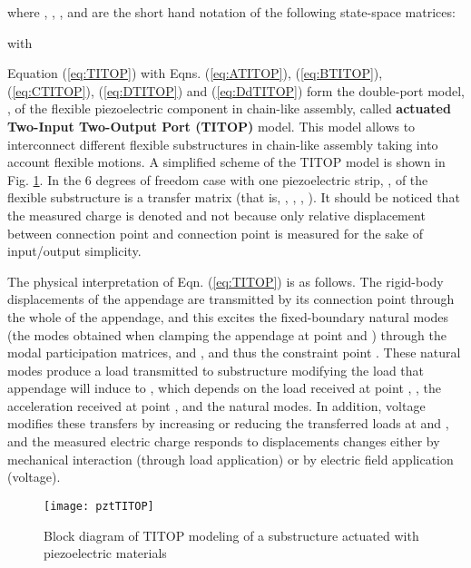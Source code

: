 \documentclass{ifacconf}
\begin{document}
where , , ,  and  are the short hand notation of the following state-space matrices:















with 



Equation (\ref{eq:TITOP}) with Eqns. (\ref{eq:ATITOP}), (\ref{eq:BTITOP}), (\ref{eq:CTITOP}), (\ref{eq:DTITOP}) and (\ref{eq:DdTITOP}) form the double-port model, , of the flexible piezoelectric component  in chain-like assembly, called \textbf{actuated Two-Input Two-Output Port (TITOP)} model. This model allows to interconnect different flexible substructures in chain-like assembly taking into account flexible motions. A simplified scheme of the TITOP model is shown in Fig. \ref{fig:pztTITOP}. In the 6 degrees of freedom case with one piezoelectric strip, , of the flexible substructure  is a  transfer matrix (that is, , , , ). It should be noticed that the measured charge is denoted  and not  because only relative displacement between connection point  and connection point  is measured for the sake of input/output simplicity.

The physical interpretation of Eqn. (\ref{eq:TITOP}) is as follows. The rigid-body displacements of the appendage  are transmitted by its connection point  through the whole of the appendage, and this excites the fixed-boundary natural modes (the modes obtained when clamping the appendage at point  and ) through the modal participation matrices,  and , and thus the constraint point . These natural modes produce a load transmitted to substructure  modifying the load that appendage  will induce to , which depends on the load received at point , , the acceleration received at point ,  and the natural modes. In addition, voltage  modifies these transfers by increasing or reducing the transferred loads at  and , and the measured electric charge  responds to displacements changes either by mechanical interaction (through load application) or by electric field application (voltage).

\begin{figure} 
\center
\texttt{[image: pztTITOP]}
\caption{Block diagram of TITOP modeling of a substructure actuated with piezoelectric materials}
\label{fig:pztTITOP}
\end{figure}
\end{document}
